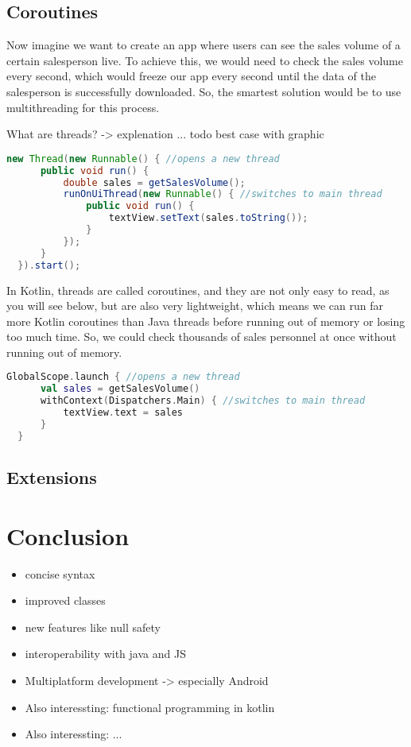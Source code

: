 \documentclass[a4paper, 11pt]{article}
\begin{document}
\subsection{Coroutines}
  Now imagine we want to create an app where users can see the sales volume of a certain salesperson live. To achieve this, we would need to check the sales volume every second, which would freeze our app every second until the data of the salesperson is successfully downloaded. So, the smartest solution would be to use multithreading for this process.

  What are threads? -> explenation ... todo
  best case with graphic

  \begin{lstlisting}[language=Java, title={Java Background Threads}]
  new Thread(new Runnable() { //opens a new thread
      public void run() {
          double sales = getSalesVolume();
          runOnUiThread(new Runnable() { //switches to main thread
              public void run() {
                  textView.setText(sales.toString());
              }
          });
      }
  }).start();
  \end{lstlisting}
  In Kotlin, threads are called coroutines, and they are not only easy to read, as you will see below, but are also very lightweight, which means we can run far more Kotlin coroutines than Java threads before running out of memory or losing too much time.
  So, we could check thousands of sales personnel at once without running out of memory.
  \begin{lstlisting}[language = Kotlin, title = Kotlin Coroutines]
  GlobalScope.launch { //opens a new thread
      val sales = getSalesVolume() 
      withContext(Dispatchers.Main) { //switches to main thread
          textView.text = sales 
      }
  }
  \end{lstlisting}

\subsection{Extensions}


\section{Conclusion}
  \begin{itemize}
    \item concise syntax
    \item improved classes
    \item new features like null safety
    \item interoperability with java and JS
    \item Multiplatform development -> especially Android
    \item Also interessting: functional programming in kotlin
    \item Also interessting: ...
  \end{itemize}
\end{document}
